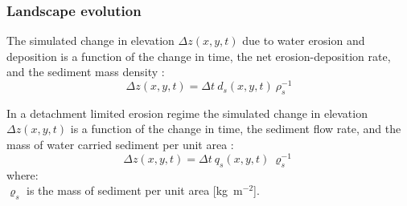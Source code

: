 \documentclass[gmd, manuscript]{copernicus}
\begin{document}

\subsubsection{Landscape evolution}

The simulated change in elevation $\Delta z(x,y,t)$ due to water erosion and deposition
is a function of
the change in time, the net erosion-deposition rate, and the sediment mass density 
\citep{Mitasova2013}:
\begin{equation}
\label{eq:evolution} 
{\Delta z(x,y,t) = \Delta t ~ d_s(x,y,t) ~ \rho_s^{-1} }
\end{equation}

\noindent
In a detachment limited erosion regime
the simulated change in elevation $\Delta z(x,y,t)$
is a function of
the change in time, the sediment flow rate, and the mass of water carried sediment per unit area
\citep{Mitasova2013}:
\begin{equation}
\label{eq:flux_evolution} 
{\Delta z(x,y,t) = \Delta t ~ q_s(x,y,t) ~ \varrho_s^{-1} } 
\end{equation}
{\small
\noindent
where: \\
\noindent
\hspace*{0.5em} $\varrho_s$ is the mass of sediment per unit area [\unit{kg ~ m}$^{-2}$].\\
}

\end{document}

